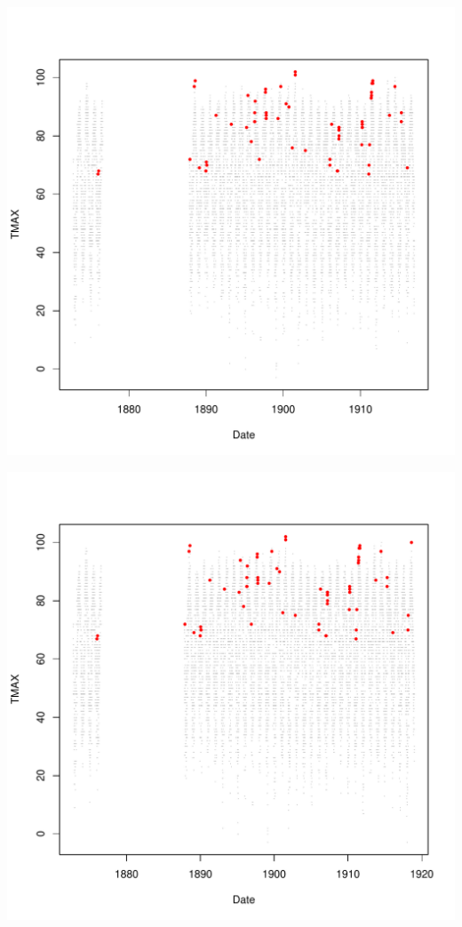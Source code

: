\documentclass{article}\usepackage[]{graphicx}\usepackage[]{color}
\makeatletter
\def\maxwidth{ %
  \ifdim\Gin@nat@width>\linewidth
    \linewidth
  \else
    \Gin@nat@width
  \fi
}
\newenvironment{knitrout}{}{} %
\makeatother
\begin{document}
\begin{knitrout}
\includegraphics[width=\maxwidth]{figure/unnamed-chunk-4-18} 

\includegraphics[width=\maxwidth]{figure/unnamed-chunk-4-19} 


\end{knitrout}
\end{document}
